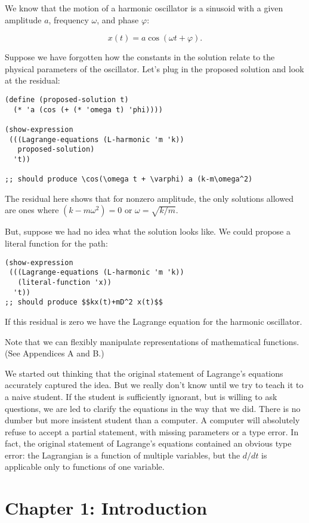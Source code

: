 \documentclass[11pt]{article}
\begin{document}
We know that the motion of a harmonic oscillator is a sinusoid with a given
amplitude \(a\), frequency \(\omega\), and phase \(\varphi\):

$$x(t) = a \cos(\omega t + \varphi).$$

Suppose we have forgotten how the constants in the solution relate to the
physical parameters of the oscillator. Let’s plug in the proposed solution and
look at the residual:

\begin{verbatim}
(define (proposed-solution t)
  (* 'a (cos (+ (* 'omega t) 'phi))))

(show-expression
 (((Lagrange-equations (L-harmonic 'm 'k))
   proposed-solution)
  't))

;; should produce \cos(\omega t + \varphi) a (k-m\omega^2)
\end{verbatim}

The residual here shows that for nonzero amplitude, the only solutions allowed
are ones where \((k - m\omega^2) = 0\) or \(\omega = \sqrt{k/m}\).

But, suppose we had no idea what the solution looks like. We could propose a
literal function for the path:

\begin{verbatim}
(show-expression
 (((Lagrange-equations (L-harmonic 'm 'k))
   (literal-function 'x))
  't))
;; should produce $$kx(t)+mD^2 x(t)$$
\end{verbatim}

If this residual is zero we have the Lagrange equation for the harmonic
oscillator.

Note that we can flexibly manipulate representations of mathematical functions.
(See Appendices A and B.)

We started out thinking that the original statement of Lagrange’s equations
accurately captured the idea. But we really don’t know until we try to teach it
to a naive student. If the student is sufficiently ignorant, but is willing to
ask questions, we are led to clarify the equations in the way that we did. There
is no dumber but more insistent student than a computer. A computer will
absolutely refuse to accept a partial statement, with missing parameters or a
type error. In fact, the original statement of Lagrange’s equations contained an
obvious type error: the Lagrangian is a function of multiple variables, but the
\(d/dt\) is applicable only to functions of one variable.

\section{Chapter 1: Introduction}
\label{sec:org1bd4f29}
\end{document}
